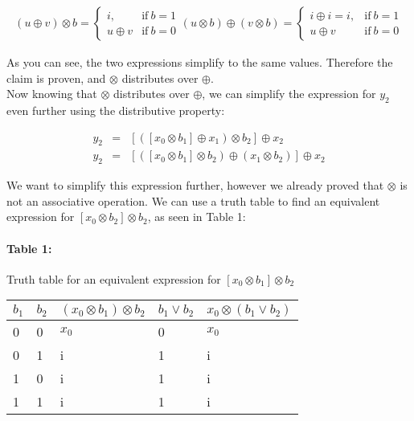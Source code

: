 \documentclass[11pt]{article}
\begin{document}
  \begin{eqnarray*}
    (u \oplus v) \otimes b =
    \begin{cases}
      i, & \text{if}\ b = 1 \\
      u \oplus v & \text{if}\ b = 0
    \end{cases}
    (u \otimes b) \oplus (v \otimes b) =
    \begin{cases}
      i \oplus i = i, & \text{if}\ b = 1 \\
      u \oplus v & \text{if}\ b = 0
    \end{cases}
  \end{eqnarray*}

As you can see, the two expressions simplify to the same values. Therefore the claim is proven, and $\otimes$ distributes over $\oplus$.\\

Now knowing that $\otimes$ distributes over $\oplus$, we can simplify the expression for $y_2$ even further using the distributive property:

  \begin{eqnarray*}
    y_2 &=& [([x_0 \otimes b_1] \oplus x_1) \otimes b_2] \oplus x_2\\
    y_2 &=& [([x_0 \otimes b_1] \otimes b_2) \oplus (x_1 \otimes b_2)] \oplus x_2
  \end{eqnarray*}

  We want to simplify this expression further, however we already proved that $\otimes$ is not an associative operation. We can use a truth table to find an equivalent expression for $[x_0 \otimes b_2] \otimes b_2$, as seen in Table 1:

\paragraph{Table 1:} Truth table for an equivalent expression for $[x_0 \otimes b_1] \otimes b_2$

\begin{tabu} to 0.8\textwidth { | X[3] | X[3] | X[3] | X[3] | X[3] |}
 \hline
 $b_1$ & $b_2$ & $(x_0 \otimes b_1) \otimes b_2$ & $b_1 \vee b_2$ & $x_0 \otimes (b_1 \vee b_2)$ \\
  & 0 & $x_0$ & 0 & $x_0$  \\
 & 1 & i & 1 & i  \\
 & 0 & i & 1 & i  \\
 & 1 & i & 1 & i  \\
\hline
\end{tabu}
\end{document}
